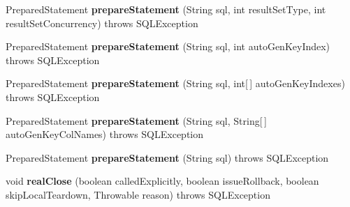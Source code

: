 \begin{DoxyCompactItemize}
\item 
\mbox{\label{classcom_1_1mysql_1_1cj_1_1jdbc_1_1ha_1_1_multi_host_my_s_q_l_connection_a37f91cfbb410515eae656f2749714a96}} 
Prepared\+Statement {\bfseries prepare\+Statement} (String sql, int result\+Set\+Type, int result\+Set\+Concurrency)  throws S\+Q\+L\+Exception 
\item 
\mbox{\label{classcom_1_1mysql_1_1cj_1_1jdbc_1_1ha_1_1_multi_host_my_s_q_l_connection_a5e08398e0f2ff6b7450f3d2200d250b4}} 
Prepared\+Statement {\bfseries prepare\+Statement} (String sql, int auto\+Gen\+Key\+Index)  throws S\+Q\+L\+Exception 
\item 
\mbox{\label{classcom_1_1mysql_1_1cj_1_1jdbc_1_1ha_1_1_multi_host_my_s_q_l_connection_ae8271152c79bc6964317cf0ed1568e90}} 
Prepared\+Statement {\bfseries prepare\+Statement} (String sql, int\mbox{[}$\,$\mbox{]} auto\+Gen\+Key\+Indexes)  throws S\+Q\+L\+Exception 
\item 
\mbox{\label{classcom_1_1mysql_1_1cj_1_1jdbc_1_1ha_1_1_multi_host_my_s_q_l_connection_a7d26af1cd0ebb70f66bb6e2324f4bd45}} 
Prepared\+Statement {\bfseries prepare\+Statement} (String sql, String\mbox{[}$\,$\mbox{]} auto\+Gen\+Key\+Col\+Names)  throws S\+Q\+L\+Exception 
\item 
\mbox{\label{classcom_1_1mysql_1_1cj_1_1jdbc_1_1ha_1_1_multi_host_my_s_q_l_connection_afa2f8981f698b2b0ba146da7672f890a}} 
Prepared\+Statement {\bfseries prepare\+Statement} (String sql)  throws S\+Q\+L\+Exception 
\item 
\mbox{\label{classcom_1_1mysql_1_1cj_1_1jdbc_1_1ha_1_1_multi_host_my_s_q_l_connection_adbed19e958ded6aa76e2e1cd5c6e51be}} 
void {\bfseries real\+Close} (boolean called\+Explicitly, boolean issue\+Rollback, boolean skip\+Local\+Teardown, Throwable reason)  throws S\+Q\+L\+Exception 
\item 
\mbox{\label{classcom_1_1mysql_1_1cj_1_1jdbc_1_1ha_1_1_multi_host_my_s_q_l_connection_a861ff794887b4e5d0cd1ae1d2477bd9b}} 

\end{DoxyCompactItemize}
